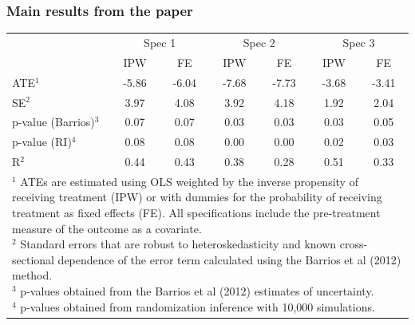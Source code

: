 \documentclass{beamer}
\begin{document}
\begin{frame}
\frametitle{Main results from the paper}


\begin{table}[ht]
\centering
{\footnotesize \begin{tabular}{lcccccc}
  \hline 
  & \multicolumn{2}{c}{Spec 1} &  \multicolumn{2}{c}{Spec 2} & \multicolumn{2}{c}{Spec 3} \\
 & IPW & FE & IPW & FE & IPW & FE \\ 
  \hline
ATE$^1$ & -5.86 & -6.04 & -7.68 & -7.73 & -3.68 & -3.41 \\ 
  SE$^2$ & 3.97 & 4.08 & 3.92 & 4.18 & 1.92 & 2.04 \\ 
  p-value (Barrios)$^3$ & 0.07 & 0.07 & 0.03 & 0.03 & 0.03 & 0.05 \\ 
  p-value (RI)$^4$ & 0.08 & 0.08 & 0.00 & 0.00 & 0.02 & 0.03 \\ 
  R$^2$ & 0.44 & 0.43 & 0.38 & 0.28 & 0.51 & 0.33 \\ 
   \hline
   \multicolumn{7}{l}{\parbox{.9\textwidth}{{\tiny  $^1$ ATEs are estimated using OLS weighted by the inverse propensity of receiving treatment (IPW) or with dummies for the probability of receiving treatment as fixed effects (FE). All specifications include the pre-treatment measure of the outcome as a covariate. \\
   $^2$ Standard errors that are robust to heteroskedasticity and known cross-sectional dependence of the error term calculated using the Barrios et al (2012) method. \\
   $^3$ p-values obtained from the Barrios et al (2012) estimates of uncertainty.  \\
   $^4$ p-values obtained from randomization inference with 10,000 simulations. }}} \\
\end{tabular}}
\end{table}


\end{frame}
\end{document}
